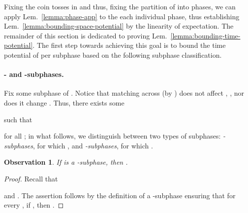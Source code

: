 \documentclass[11pt]{article}
\newtheorem{observation}[theorem]{Observation}
\theoremstyle{definition}
\theoremstyle{plain}
\newtheorem{observation}[theorem]{Observation}
\theoremstyle{definition}
\theoremstyle{plain}
\newtheorem{observation}{Observation}[section]
\theoremstyle{definition}
\theoremstyle{plain}
\newcommand{\Lem}{Lem.}
\begin{document}
Fixing the coin tosses in  and thus, fixing the partition of
 into phases, we can apply \Lem{}~\ref{lemma:phase-app}
to the each individual phase, thus establishing
\Lem{}~\ref{lemma:bounding-space-potential} by the linearity of expectation.
The remainder of this section is dedicated to proving
\Lem{}~\ref{lemma:bounding-time-potential}.
The first step towards achieving this goal is to bound the time potential of
 per subphase based on the following subphase classification.

\paragraph{- and -subphases.}
Fix some subphase  of .
Notice that matching across  (by ) does not affect , , nor does it change
.
Thus, there exists some

such that

for all
;
in what follows, we distinguish between two types of subphases:
\emph{-subphases}, for which , and \emph{-subphases}, for which
.

\begin{observation} \label{observation:bound-time-cost-1-subphase}
If  is a -subphase, then
.
\end{observation}
\begin{proof}
Recall that

and
.
The assertion follows by the definition of a -subphase ensuring that for
every
,
if
,
then
.
\end{proof}
\end{document}
